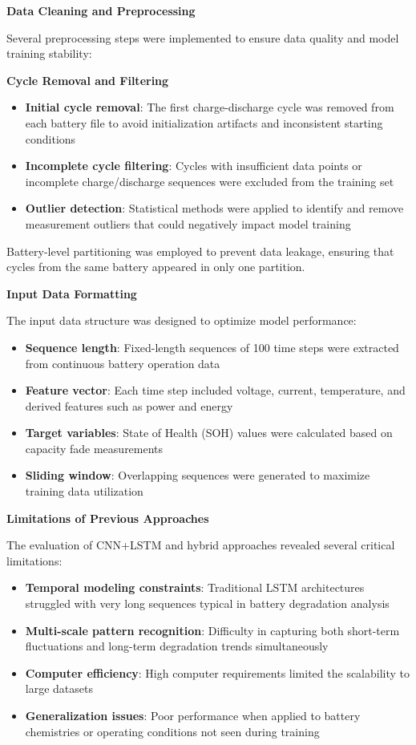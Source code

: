 \textbf{Data Cleaning and Preprocessing}

Several preprocessing steps were implemented to ensure data quality and model training stability:

\textbf{Cycle Removal and Filtering}

\begin{itemize}
    \item \textbf{Initial cycle removal}: The first charge-discharge cycle was removed from each battery file to avoid initialization artifacts and inconsistent starting conditions
    \item \textbf{Incomplete cycle filtering}: Cycles with insufficient data points or incomplete charge/discharge sequences were excluded from the training set
    \item \textbf{Outlier detection}: Statistical methods were applied to identify and remove measurement outliers that could negatively impact model training
\end{itemize}
Battery-level partitioning was employed to prevent data leakage, ensuring that cycles from the same battery appeared in only one partition.

\textbf{Input Data Formatting}

The input data structure was designed to optimize model performance:

\begin{itemize}
    \item \textbf{Sequence length}: Fixed-length sequences of 100 time steps were extracted from continuous battery operation data
    \item \textbf{Feature vector}: Each time step included voltage, current, temperature, and derived features such as power and energy
    \item \textbf{Target variables}: State of Health (SOH) values were calculated based on capacity fade measurements
    \item \textbf{Sliding window}: Overlapping sequences were generated to maximize training data utilization
\end{itemize}

\textbf{Limitations of Previous Approaches}

The evaluation of CNN+LSTM and hybrid approaches revealed several critical limitations:

\begin{itemize}
    \item \textbf{Temporal modeling constraints}: Traditional LSTM architectures struggled with very long sequences typical in battery degradation analysis
    \item \textbf{Multi-scale pattern recognition}: Difficulty in capturing both short-term fluctuations and long-term degradation trends simultaneously
    \item \textbf{Computer efficiency}: High computer requirements limited the scalability to large datasets
    \item \textbf{Generalization issues}: Poor performance when applied to battery chemistries or operating conditions not seen during training
\end{itemize}

